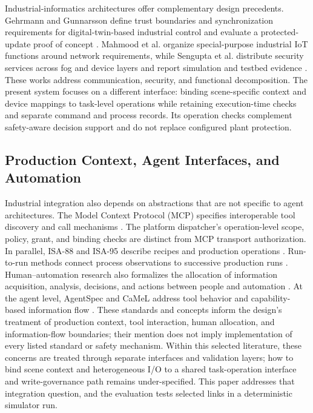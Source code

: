 Industrial-informatics architectures offer complementary design precedents.
Gehrmann and Gunnarsson define trust boundaries and synchronization
requirements for digital-twin-based industrial control and evaluate a
protected-update proof of concept
\cite{gehrmann2020dtiacs}. Mahmood et al. organize special-purpose industrial
IoT functions around network requirements, while Sengupta et al. distribute
security services across fog and device layers and report simulation and
testbed evidence \cite{mahmood2023functional,sengupta2021securefog}. These
works address communication, security, and functional decomposition. The
present system focuses on a different interface: binding scene-specific
context and device mappings to task-level operations while retaining
execution-time checks and separate command and process records. Its operation
checks complement safety-aware decision support
\cite{jiang2026agentic} and do not replace configured plant protection.

\subsection{Production Context, Agent Interfaces, and Automation}
Industrial integration also depends on abstractions that are not specific to
agent architectures. The Model Context Protocol (MCP) specifies interoperable
tool discovery and call mechanisms \cite{mcp2024}. The platform dispatcher's
operation-level scope, policy, grant, and binding checks are distinct from MCP
transport authorization. In parallel,
ISA-88 and ISA-95 describe recipes and production operations
\cite{isa88_2010,isa95_2025}. Run-to-run methods connect process observations
to successive production runs \cite{moyne2000r2r}. Human--automation research
also formalizes the allocation of information acquisition, analysis, decisions,
and actions between people and automation \cite{parasuraman2000model}. At the
agent level, AgentSpec and CaMeL address tool behavior and capability-based
information flow \cite{wang2025agentspec,debenedetti2025camel}. These
standards and concepts inform the design's treatment of production context,
tool interaction, human allocation, and information-flow boundaries; their
mention does not imply implementation of every listed standard or safety
mechanism. Within this selected literature, these concerns are treated through
separate interfaces and validation layers; how to bind scene context and
heterogeneous I/O to a shared task-operation interface and write-governance
path remains under-specified. This paper addresses that integration question,
and the evaluation tests selected links in a deterministic simulator run.
